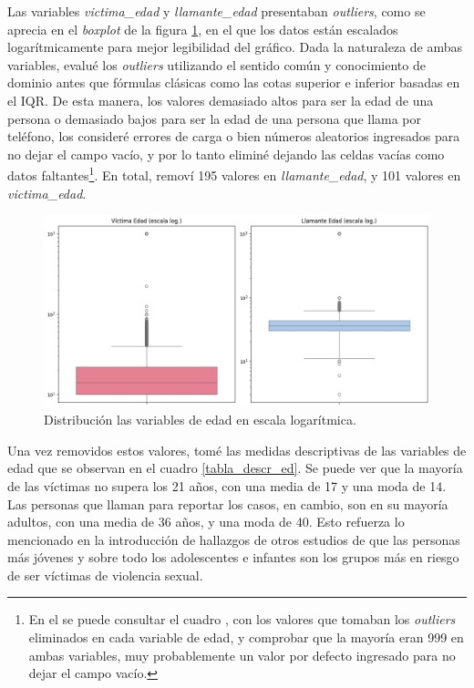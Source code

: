 \documentclass[10 pt]{article}
\begin{document}
Las variables \textit{victima\_edad} y \textit{llamante\_edad} presentaban \textit{outliers}, como se aprecia en el \textit{boxplot} de la figura \ref{box_edades_log}, en el que los datos están escalados logarítmicamente para mejor legibilidad del gráfico. Dada la naturaleza de ambas variables, evalué los \textit{outliers} utilizando el sentido común y conocimiento de dominio antes que fórmulas clásicas como las cotas superior e inferior basadas en el IQR. De esta manera, los valores demasiado altos para ser la edad de una persona o demasiado bajos para ser la edad de una persona que llama por teléfono, los consideré errores de carga o bien números aleatorios ingresados para no dejar el campo vacío, y por lo tanto eliminé dejando las celdas vacías como datos faltantes\footnote{En el  se puede consultar el cuadro , con los valores que tomaban los \textit{outliers} eliminados en cada variable de edad, y comprobar que la mayoría eran 999 en ambas variables, muy probablemente un valor por defecto ingresado para no dejar el campo vacío.}. En total, removí 195 valores en \textit{llamante\_edad}, y 101 valores en \textit{victima\_edad}. 

\begin{figure}[H]
    \begin{center}
    \includegraphics[scale=.5]{images/latex_boxplot_edades_outliers.png}
    \caption{Distribución las variables de edad en escala logarítmica.}
    \label{box_edades_log}
    \end{center}
    \end{figure}


Una vez removidos estos valores, tomé las medidas descriptivas de las variables de edad que se observan en el cuadro \ref{tabla_descr_ed}. Se puede ver que la mayoría de las víctimas no supera los 21 años, con una media de 17 y una moda de 14. Las personas que llaman para reportar los casos, en cambio, son en su mayoría adultos, con una media de 36 años, y una moda de 40. Esto refuerza lo mencionado en la introducción de hallazgos de otros estudios de que las personas más jóvenes y sobre todo los adolescentes e infantes son los grupos más en riesgo de ser víctimas de violencia sexual. 
\end{document}
